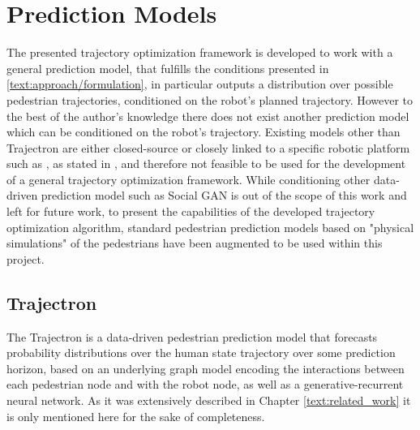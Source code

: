 \section{Prediction Models}
\label{text:experiments/environments}
The presented trajectory optimization framework is developed to work with a general prediction model, that fulfills the conditions presented in \ref{text:approach/formulation}, in particular outputs a distribution over possible pedestrian trajectories, conditioned on the robot's planned trajectory. However to the best of the author's knowledge there does not exist another prediction model which can be conditioned on the robot's trajectory. Existing models other than Trajectron \cite{Salzmann2020} are either closed-source or closely linked to a specific robotic platform such as \cite{Casas2019}\cite{Casas2018}\cite{Britz2017}\cite{Jain2019}, as stated in \cite{Salzmann2020}, and therefore not feasible to be used for the development of a general trajectory optimization framework. While conditioning other data-driven prediction model such as Social GAN \cite{Gupta2018} is out of the scope of this work and left for future work, to present the capabilities of the developed trajectory optimization algorithm, standard pedestrian prediction models based on "physical simulations" of the pedestrians have been augmented to be used within this project.

\subsection{Trajectron}
The Trajectron \cite{Ivanovic2018}\cite{Salzmann2020} is a data-driven pedestrian prediction model that forecasts probability distributions over the human state trajectory over some prediction horizon, based on an underlying graph model encoding the interactions between each pedestrian node and with the robot node, as well as a generative-recurrent neural network. As it was extensively described in Chapter \ref{text:related_work} it is only mentioned here for the sake of completeness. 

